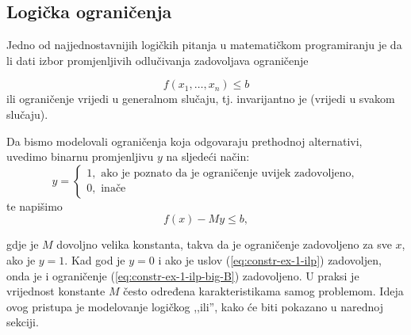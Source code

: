 \documentclass[b5paper, utf8, 11pt, colorlinks]{book}
\theoremstyle{definition}
\begin{document}

\subsection{Logička ograničenja}
Jedno od najjednostavnijih logičkih pitanja u matematičkom programiranju je da li dati izbor promjenljivih odlučivanja zadovoljava ograničenje

\begin{equation}\label{eq:constr-ex-1-ilp}
	f(x_1,\ldots, x_n )\leq b
\end{equation}
ili   ograničenje vrijedi u generalnom slučaju, tj. invarijantno je (vrijedi u svakom slučaju). 

Da bismo modelovali ograničenja koja odgovaraju prethodnoj alternativi, uvedimo binarnu promjenljivu $y$ na sljedeći način:
$$y =\begin{cases}
	1, \mbox{ ako je poznato da je ograničenje uvijek zadovoljeno}, \\
	0, \mbox{ inače} 
\end{cases}$$ 
te napišimo  
\begin{equation}\label{eq:constr-ex-1-ilp-big-B}
	f(x) - M y \leq b,
\end{equation}

gdje je $M$ dovoljno velika konstanta, takva da je 
ograničenje zadovoljeno za sve $x$, ako je $y =1$. Kad god je $y=0$ i ako je uslov (\ref{eq:constr-ex-1-ilp}) zadovoljen, onda je i ograničenje (\ref{eq:constr-ex-1-ilp-big-B}) zadovoljeno. U praksi je vrijednost  konstante $M$ često određena karakteristikama samog problemom. Ideja ovog pristupa je modelovanje logičkog ,,ili'', kako će biti pokazano u narednoj sekciji.  %
\end{document}

